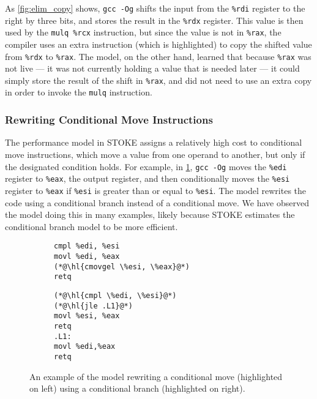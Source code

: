 \documentclass{article}
\begin{document}
As \cref{fig:elim_copy} shows,
\texttt{gcc -Og} shifts the input from the \lstinline{%rdi} register to the right by three bits, and stores the result in the \lstinline{%rdx} register.  This value is then used by the \lstinline{mulq %rcx} instruction, but since the value is not in \lstinline{%rax}, the compiler uses an extra instruction (which is highlighted) to copy the shifted value from \lstinline{%rdx} to \lstinline{%rax}.
%
The model, on the other hand, learned that because \lstinline{%rax} was not live --- it was not currently holding a value that is needed later --- it could simply store the result of the shift in \lstinline{%rax}, and did not need to use an extra copy in order to invoke the \lstinline{mulq} instruction.

\subsubsection{Rewriting Conditional Move Instructions}


The performance model in STOKE assigns a relatively high cost to conditional move instructions, which move a value from one operand to another, but only if the designated condition holds.  For example, in \cref{fig:conditional_move}, \texttt{gcc -Og} moves the \lstinline{%edi} register to \lstinline{%eax}, the output register, and then conditionally moves the \lstinline{%esi} register to \lstinline{%eax} if \lstinline{%esi} is greater than or equal to \lstinline{%esi}.
%
The model rewrites the code using a conditional branch instead of a conditional move.  We have observed the model doing this in many examples, likely because STOKE estimates the conditional branch model to be more efficient.

\begin{figure}
    \centering
    \begin{subfigure}[t]{\codeboxwidth}
    \begin{lstlisting}[language={[x64]Assembler}]
cmpl %edi, %esi     
movl %edi, %eax    
(*@\hl{cmovgel \%esi, \%eax}@*)
retq 
\end{lstlisting}
    \caption{\ogcodecaption}
    \end{subfigure}
    \hfil
    \begin{subfigure}[t]{\codeboxwidth}
    \begin{lstlisting}
(*@\hl{cmpl \%edi, \%esi}@*)     
(*@\hl{jle .L1}@*)
movl %esi, %eax
retq
.L1:
movl %edi,%eax
retq
\end{lstlisting}
    \caption{\modelcodecaption}
    \end{subfigure}
    \caption{An example of the model rewriting a conditional move (highlighted on left) using a conditional branch (highlighted on right).}
    \label{fig:conditional_move}
\end{figure}
\end{document}
